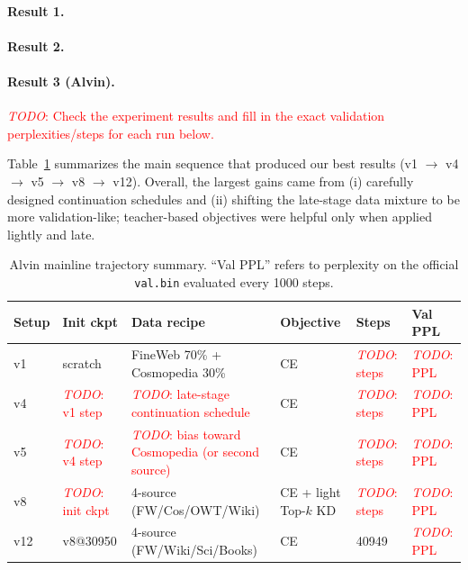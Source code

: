 \documentclass{article}
\renewcommand{\todo}[1]{\textcolor{red}{\emph{TODO}: #1}}
\begin{document}
\paragraph{Result 1.}
\paragraph{Result 2.}
\paragraph{Result 3 (Alvin).}
\todo{Check the experiment results and fill in the exact validation perplexities/steps for each run below.}

Table~\ref{tab:alvin_mainline} summarizes the main sequence that produced our best results (v1 $\rightarrow$ v4 $\rightarrow$ v5 $\rightarrow$ v8 $\rightarrow$ v12). Overall, the largest gains came from (i) carefully designed continuation schedules and (ii) shifting the late-stage data mixture to be more validation-like; teacher-based objectives were helpful only when applied lightly and late.

\begin{table}[t]
\centering
\small
\begin{tabular}{@{}llllll@{}}
\toprule
Setup & Init ckpt & Data recipe & Objective & Steps & Val PPL \\
\midrule
v1  & scratch & FineWeb 70\% + Cosmopedia 30\% & CE & \todo{steps} & \todo{PPL} \\
v4  & \todo{v1 step} & \todo{late-stage continuation schedule} & CE & \todo{steps} & \todo{PPL} \\
v5  & \todo{v4 step} & \todo{bias toward Cosmopedia (or second source)} & CE & \todo{steps} & \todo{PPL} \\
v8  & \todo{init ckpt} & 4-source (FW/Cos/OWT/Wiki) & CE + light Top-$k$ KD & \todo{steps} & \todo{PPL} \\
v12 & v8@30950 & 4-source (FW/Wiki/Sci/Books) & CE & 40949 & \todo{PPL} \\
\bottomrule
\end{tabular}
\caption{Alvin mainline trajectory summary. ``Val PPL'' refers to perplexity on the official \texttt{val.bin} evaluated every 1000 steps.}
\label{tab:alvin_mainline}
\end{table}
\end{document}
